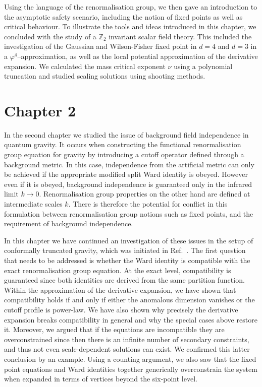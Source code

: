 \documentclass[11pt]{book}
\numberwithin{equation}{chapter}
\begin{document}
Using the language of the renormalisation group, we then gave an introduction
to the asymptotic safety scenario, including the notion of fixed points
as well as critical behaviour. To illustrate the tools and ideas introduced
in this chapter, we concluded with the study of a $\mathbb Z_2$ invariant
scalar field theory. This included the investigation of the
Gaussian and Wilson-Fisher fixed point in $d=4$ and $d=3$ in a
$\varphi^4$--approximation, as well as the local potential approximation
of the derivative expansion.
We calculated the mass critical exponent $\nu$ using a polynomial truncation
and studied scaling solutions using shooting methods.

\section*{Chapter 2}

In the second chapter we studied the issue of background field independence in quantum gravity.
It occurs when constructing the functional renormalisation group equation for gravity by introducing a
cutoff operator defined through a background metric. In this case, independence from the artificial
metric can only be achieved if the appropriate modified split Ward identity is obeyed.
However even if it is obeyed, background independence is guaranteed
only in the infrared limit $k\to0$.
Renormalisation group properties on the other hand are defined at intermediate scales $k$.
There is therefore the potential for conflict in this formulation between
renormalisation group notions such as fixed points,
and the requirement of background independence.

In this chapter we have continued an investigation of these issues
in the setup of conformally truncated gravity, which was initiated in Ref.~\cite{Dietz:2015owa}.
The first question that needs to be addressed is whether the Ward identity
is compatible with the exact renormalisation group equation.
At the exact level, compatibility is guaranteed since both identities
are derived from the same partition function.
Within the approximation of the derivative expansion,
we have shown that compatibility holds if and only if either the anomalous
dimension vanishes or the cutoff profile is power-law.
We have also shown why precisely the derivative expansion breaks compatibility
in general and why the special cases above restore it.
Moreover, we argued that if the equations are incompatible they are overconstrained
since then there is an infinite number of secondary constraints,
and thus not even scale-dependent solutions can exist.
We confirmed this latter conclusion by an example.
Using a counting argument, we also saw that the fixed point equations and Ward identities together
generically overconstrain the system when expanded in terms of vertices beyond the six-point level.
\end{document}
